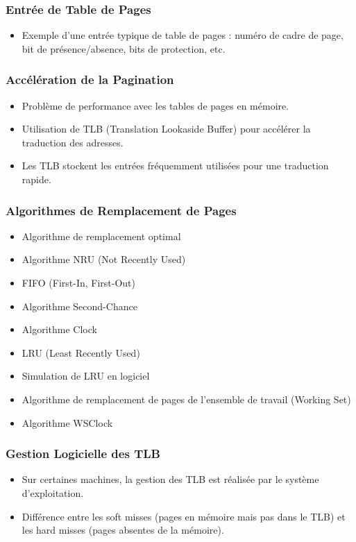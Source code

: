\documentclass[10pt]{beamer}
\begin{document}
\begin{frame}
    \frametitle{Entrée de Table de Pages}
    \begin{itemize}
        \item Exemple d'une entrée typique de table de pages : numéro de cadre
              de
              page, bit de présence/absence, bits de protection, etc.
    \end{itemize}
\end{frame}

\begin{frame}
    \frametitle{Accélération de la Pagination}
    \begin{itemize}
        \item Problème de performance avec les tables de pages en mémoire.
        \item Utilisation de TLB (Translation Lookaside Buffer) pour accélérer
              la
              traduction des adresses.
        \item Les TLB stockent les entrées fréquemment utilisées pour une
              traduction rapide.
    \end{itemize}
\end{frame}

\begin{frame}
    \frametitle{Algorithmes de Remplacement de Pages}
    \begin{itemize}
        \item Algorithme de remplacement optimal
        \item Algorithme NRU (Not Recently Used)
        \item FIFO (First-In, First-Out)
        \item Algorithme Second-Chance
        \item Algorithme Clock
        \item LRU (Least Recently Used)
        \item Simulation de LRU en logiciel
        \item Algorithme de remplacement de pages de l'ensemble de travail
              (Working
              Set)
        \item Algorithme WSClock
    \end{itemize}
\end{frame}

\begin{frame}
    \frametitle{Gestion Logicielle des TLB}
    \begin{itemize}
        \item Sur certaines machines, la gestion des TLB est réalisée par le
              système d'exploitation.
        \item Différence entre les soft misses (pages en mémoire mais pas dans
              le
              TLB) et les hard misses (pages absentes de la mémoire).
    \end{itemize}
\end{frame}
\end{document}
